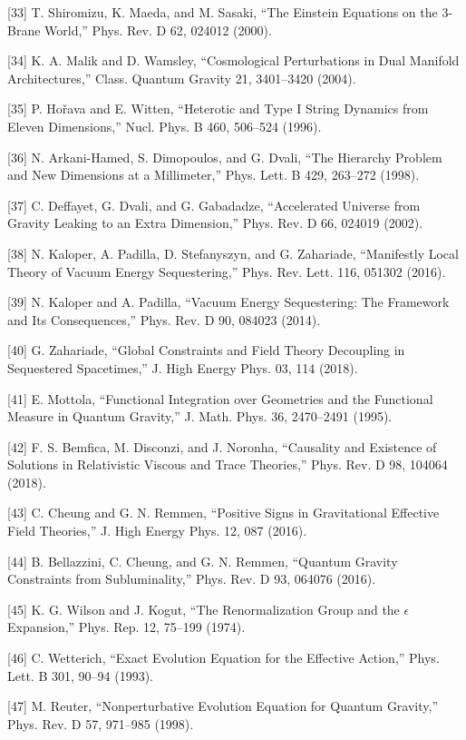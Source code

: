 \documentclass[aps,prd,onecolumn,superscriptaddress,nofootinbib,longbibliography,10pt]{revtex4-2}
\begin{document}
  [33] T. Shiromizu, K. Maeda, and M. Sasaki, “The Einstein Equations on the 3-Brane World,” Phys. Rev. D 62, 024012 (2000).


  [34] K. A. Malik and D. Wamsley, “Cosmological Perturbations in Dual Manifold Architectures,” Class. Quantum Gravity 21, 3401–3420 (2004).


  [35] P. Hořava and E. Witten, “Heterotic and Type I String Dynamics from Eleven Dimensions,” Nucl. Phys. B 460, 506–524 (1996).


  [36] N. Arkani-Hamed, S. Dimopoulos, and G. Dvali, “The Hierarchy Problem and New Dimensions at a Millimeter,” Phys. Lett. B 429, 263–272 (1998).


  [37] C. Deffayet, G. Dvali, and G. Gabadadze, “Accelerated Universe from Gravity Leaking to an Extra Dimension,” Phys. Rev. D 66, 024019 (2002).


  [38] N. Kaloper, A. Padilla, D. Stefanyszyn, and G. Zahariade, “Manifestly Local Theory of Vacuum Energy Sequestering,” Phys. Rev. Lett. 116, 051302 (2016).


  [39] N. Kaloper and A. Padilla, “Vacuum Energy Sequestering: The Framework and Its Consequences,” Phys. Rev. D 90, 084023 (2014).


  [40] G. Zahariade, “Global Constraints and Field Theory Decoupling in Sequestered Spacetimes,” J. High Energy Phys. 03, 114 (2018).


  [41] E. Mottola, “Functional Integration over Geometries and the Functional Measure in Quantum Gravity,” J. Math. Phys. 36, 2470–2491 (1995).


  [42] F. S. Bemfica, M. Disconzi, and J. Noronha, “Causality and Existence of Solutions in Relativistic Viscous and Trace Theories,” Phys. Rev. D 98, 104064 (2018).


  [43] C. Cheung and G. N. Remmen, “Positive Signs in Gravitational Effective Field Theories,” J. High Energy Phys. 12, 087 (2016).


  [44] B. Bellazzini, C. Cheung, and G. N. Remmen, “Quantum Gravity Constraints from Subluminality,” Phys. Rev. D 93, 064076 (2016).


  [45] K. G. Wilson and J. Kogut, “The Renormalization Group and the \(\epsilon\) Expansion,” Phys. Rep. 12, 75–199 (1974).


  [46] C. Wetterich, “Exact Evolution Equation for the Effective Action,” Phys. Lett. B 301, 90–94 (1993).


  [47] M. Reuter, “Nonperturbative Evolution Equation for Quantum Gravity,” Phys. Rev. D 57, 971–985 (1998).
\end{document}

